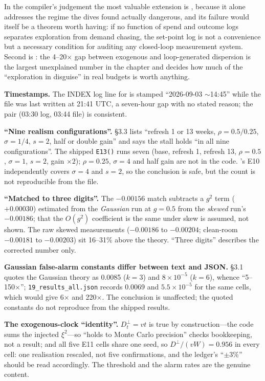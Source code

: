 In the compiler's judgement the most valuable extension is , because it alone addresses the regime the dives found actually dangerous, and its failure would itself be a theorem worth having: if no function of spend and outcome logs separates exploration from demand chasing, the set-point log is not a convenience but a necessary condition for auditing any closed-loop measurement system. Second is : the 4--20$\times$ gap between exogenous and loop-generated dispersion is the largest unexplained number in the chapter and decides how much of the ``exploration in disguise'' in real budgets is worth anything.

\begin{reviewernote}[(compiler)]
\textbf{Timestamps.} The INDEX log line for  is stamped ``2026-09-03 $\sim$14:45'' while the file was last written at 21:41 UTC, a seven-hour gap with no stated reason; the  pair (03:30 log, 03:44 file) is consistent.

\textbf{``Nine realism configurations''.}  \S3.3 lists ``refresh 1 or 13 weeks, $\rho = 0.5/0.25$, $\sigma = 1/4$, $s = 2$, half or double gain'' and says the stall holds ``in all nine configurations''. The shipped \texttt{E13()} runs seven (base, refresh 1, refresh 13, $\rho = 0.5$, $\sigma = 1$, $s = 2$, gain $\times 2$); $\rho = 0.25$, $\sigma = 4$ and half gain are not in the code. 's E10 independently covers $\sigma = 4$ and $s = 2$, so the conclusion is safe, but the count is not reproducible from the file.

\textbf{``Matched to three digits''.} The $-0.00156$ match subtracts a $g^2$ term ($+0.00030$) estimated from the \emph{Gaussian} run at $g = 0.5$ from the \emph{skewed} run's $-0.00186$; that the $O(g^2)$ coefficient is the same under skew is assumed, not shown. The raw skewed measurements ($-0.00186$ to $-0.00204$; clean-room $-0.00181$ to $-0.00203$) sit 16--31\% above the theory. ``Three digits'' describes the corrected number only.

\textbf{Gaussian false-alarm constants differ between text and JSON.}  \S3.1 quotes the Gaussian theory as 0.0085 ($k = 3$) and $8\times10^{-5}$ ($k = 6$), whence ``5--150$\times$''; \texttt{19\_results\_all.json} records 0.0069 and $5.5\times10^{-5}$ for the same cells, which would give 6$\times$ and 220$\times$. The conclusion is unaffected; the quoted constants do not reproduce from the shipped results.

\textbf{The exogenous-clock ``identity''.} $D^\perp_t = vt$ is true by construction---the code sums the injected $\xi^2$---so ``holds to Monte Carlo precision'' checks bookkeeping, not a result; and all five E11 cells share one seed, so $D^\perp/(vW) = 0.956$ in every cell: one realisation rescaled, not five confirmations, and the ledger's ``$\pm 3\%$'' should be read accordingly. The threshold and the alarm rates are the genuine content.


\end{reviewernote}
